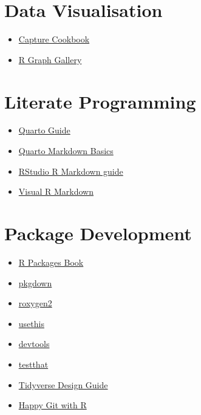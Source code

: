 \documentclass[
  letterpaper,
  DIV=11,
  numbers=noendperiod]{scrreprt}
\providecommand{\tightlist}{%
  \setlength{\itemsep}{0pt}\setlength{\parskip}{0pt}}\usepackage{longtable,booktabs,array}
\begin{document}
\section{Data Visualisation}\label{data-visualisation}

\begin{itemize}
\tightlist
\item
  \href{https://github.com/jamiehshare/capture_cookbook}{Capture
  Cookbook}
\item
  \href{https://r-graph-gallery.com/}{R Graph Gallery}
\end{itemize}

\section{Literate Programming}\label{literate-programming-1}

\begin{itemize}
\tightlist
\item
  \href{https://quarto.org/docs/guide/}{Quarto Guide}
\item
  \href{https://quarto.org/docs/authoring/markdown-basics.html}{Quarto
  Markdown Basics}
\item
  \href{https://rmarkdown.rstudio.com/lesson-1.html}{RStudio R Markdown
  guide}
\item
  \href{https://rstudio.github.io/visual-markdown-editing/\#/}{Visual R
  Markdown}
\end{itemize}

\section{Package Development}\label{package-development-1}

\begin{itemize}
\tightlist
\item
  \href{https://r-pkgs.org/}{R Packages Book}
\item
  \href{https://pkgdown.r-lib.org/}{pkgdown}
\item
  \href{https://roxygen2.r-lib.org/}{roxygen2}
\item
  \href{https://usethis.r-lib.org/}{usethis}
\item
  \href{https://devtools.r-lib.org/}{devtools}
\item
  \href{https://testthat.r-lib.org/}{testthat}
\item
  \href{https://design.tidyverse.org/}{Tidyverse Design Guide}
\item
  \href{https://happygitwithr.com/}{Happy Git with R}
\end{itemize}
\end{document}
